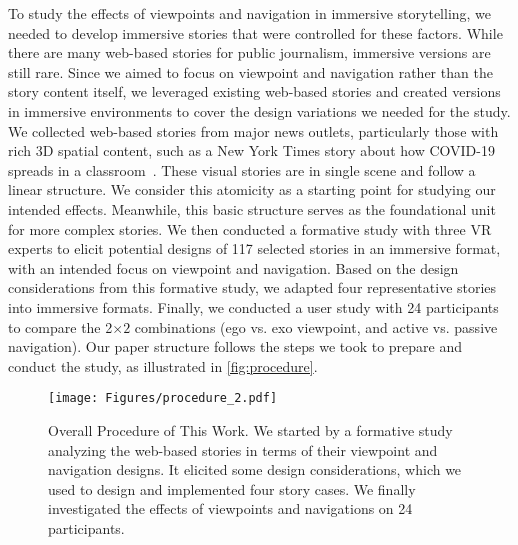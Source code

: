 To study the effects of viewpoints and navigation in immersive storytelling, we needed to develop immersive stories that were controlled for these factors. 
While there are many web-based stories for public journalism, immersive versions are still rare. Since we aimed to focus on viewpoint and navigation rather than the story content itself, we leveraged existing web-based stories and created versions in immersive environments to cover the design variations we needed for the study.
We collected web-based stories from major news outlets, particularly those with rich 3D spatial content, such as a New York Times story about how COVID-19 spreads in a classroom~\cite{covid}. 
{These visual stories are in single scene and follow a linear structure. We consider this atomicity as a starting point for studying our intended effects. Meanwhile, this basic structure serves as the foundational unit for more complex stories.}
We then conducted a formative study with three VR experts to elicit potential designs of 117 selected stories in an immersive format, with an intended focus on viewpoint and navigation.
Based on the design considerations from this formative study, we adapted four representative stories into immersive formats. Finally, we conducted a user study with 24 participants to compare the 2$\times2$ combinations (ego vs. exo viewpoint, and active vs. passive navigation).
Our paper structure follows the steps we took to prepare and conduct the study, as illustrated in \autoref{fig:procedure}.

\begin{figure*}[t]
\centering
  \texttt{[image: Figures/procedure\_2.pdf]}
  \caption{Overall Procedure of This Work. We started by a formative study analyzing the web-based stories in terms of their viewpoint and navigation designs. It elicited some design considerations, which we used to design and implemented four story cases. We finally investigated the effects of viewpoints and navigations on 24 participants.}
  \label{fig:procedure}
\end{figure*}

